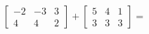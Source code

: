 \documentclass{standalone}
\begin{document}
$\left[\begin{matrix}-2 & -3 & 3\\4 & 4 & 2\end{matrix}\right] + \left[\begin{matrix}5 & 4 & 1\\3 & 3 & 3\end{matrix}\right] = $
\end{document}
